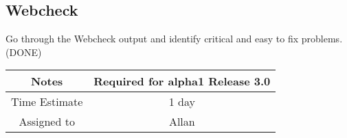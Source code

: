 \documentclass[12pt]{article}
\begin{document}
\subsection{Webcheck}

Go through the Webcheck output and identify critical and easy to fix
problems. (DONE)

{
  \vspace{5mm}
  \centering
  \begin{tabular}{|c|c|}
    \hline
    Notes
    & Required for alpha1 Release 3.0 \\
    \hline
    Time Estimate
    & 1 day \\
    \hline
    Assigned to
    & Allan \\
    \hline
  \end{tabular}
}
\end{document}
